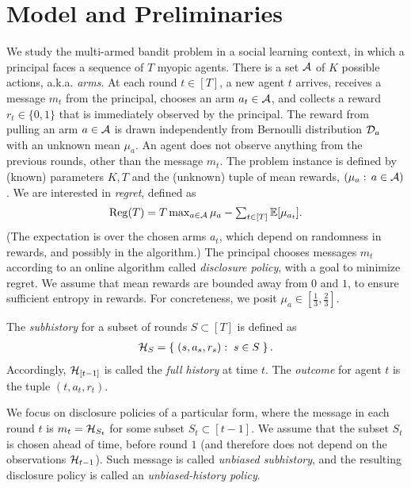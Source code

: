 \section{Model and Preliminaries}
\label{sec:model}

We study the multi-armed bandit problem in a social learning context, in which a principal faces a sequence of $T$ myopic agents. There is a set $\mathcal{A}$ of $K$ possible actions, a.k.a. \emph{arms}. At each round $t\in [T]$, a new agent $t$ arrives, receives a message $m_t$ from the principal, chooses an arm $a_t\in \mathcal{A}$, and collects a reward $r_t\in \{0,1\}$ that is immediately observed by the principal. The reward from pulling an arm $a\in \mathcal{A}$ is drawn independently from Bernoulli distribution $\mathcal{D}_a$ with an unknown mean $\mu_a$. An agent does not observe anything from the previous rounds, other than the message $m_t$. The problem instance is defined by (known) parameters $K,T$ and the (unknown) tuple of mean rewards, $(\mu_a:\,a\in\mathcal{A})$. We are interested in \emph{regret}, defined as
\begin{align}\label{eq:intro-regret-defn}
\textstyle
  \mathrm{Reg}(T)
  = T \max_{a\in \mathcal{A}} \mu_a -
  \sum_{t\in [T]} \mathbb{E}[\mu_{a_t}].
\end{align}
(The expectation is over the chosen arms $a_t$, which depend on randomness in rewards, and possibly in the algorithm.)
The principal chooses messages $m_t$ according to an online algorithm called \emph{disclosure policy}, with a goal to minimize regret. We assume that mean rewards are bounded away from $0$ and $1$, to ensure sufficient entropy in rewards. For concreteness, we posit
    $\mu_a\in [\tfrac13,\tfrac23]$.

The \emph{subhistory} for a subset of rounds $S\subset [T]$ is defined as
\begin{align} \label{eq:model-subhistory}
    \mathcal{H}_{S} = \left\{\; (s,a_s,r_s):\;s\in S \;\right\}.
\end{align}
Accordingly, $\mathcal{H}_{[t-1]}$ is called the \emph{full history} at time $t$.
The \emph{outcome} for agent $t$ is the tuple $(t,a_t,r_t)$.


We focus on disclosure policies of a particular form, where the message in each round $t$ is $m_t = \mathcal{H}_{S_t}$ for some subset $S_t\subset [t-1]$. We assume that the subset $S_t$ is chosen ahead of time, before round $1$ (and therefore does not depend on the observations $\mathcal{H}_{t-1}$). Such message is called \emph{unbiased subhistory}, and the resulting disclosure policy is called an \emph{unbiased-history policy}.

